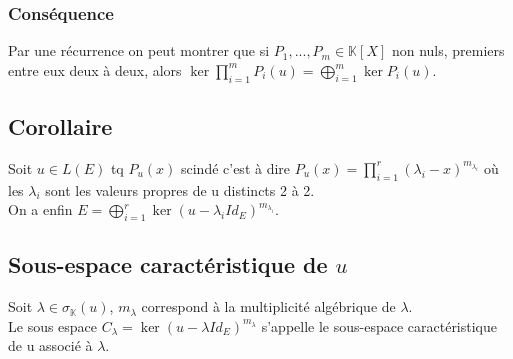 \documentclass[a4paper,10pt]{book} %
\newcommand{\K}{\mathbb{K}}
\newcommand{\displayAmath}{\displaystyle}
\begin{document}
\subsubsection{Conséquence}
Par une récurrence on peut montrer que si $P_1,...,P_m\in \K[X]$ non nuls, premiers entre eux deux à deux, alors $\displayAmath\ker \prod_{i=1}^m P_i(u)=\bigoplus_{i=1}^m \ker P_i(u)$.

\subsection{Corollaire}
Soit $u\in L(E)$ tq $P_u(x)$ scindé c'est à dire $\displayAmath P_u(x)=\prod_{i=1}^{r}(\lambda_{i}-x)^{m_{\lambda_i}}$ où les $\lambda_{i}$ sont les valeurs propres de u distincts 2 à 2.\\

On a enfin $\displayAmath E=\bigoplus_{i=1}^r \ker (u-\lambda_{i}Id_E)^{m_{\lambda_i}}$.

\subsection{Sous-espace caractéristique de $u$}
Soit $\lambda \in \sigma_{\K}(u)$, $m_\lambda$ correspond à la multiplicité algébrique de $\lambda$.\\

Le sous espace $C_\lambda = \ker (u-\lambda Id_E)^{m_\lambda}$ s'appelle le sous-espace caractéristique de u associé à $\lambda$.
\end{document}

